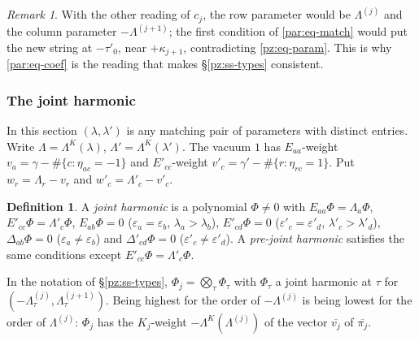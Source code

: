 \documentclass[10pt]{amsart}
\theoremstyle{definition}
\newtheorem{definition}[theorem]{Definition}
\theoremstyle{remark}
\newtheorem{remark}[theorem]{Remark}
\begin{document}
\begin{remark}\label{par:rem-match}
With the other reading of $c_j$, the row parameter would be $\Lambda^{(j)}$ and the column parameter
$-\Lambda^{(j+1)}$; the first condition of \eqref{par:eq-match} would put the new string at $-\tau'_0$,
near $+\kappa_{j+1}$, contradicting \eqref{pz:eq-param}. This is why \eqref{par:eq-coef} is the
reading that makes \S\ref{pz:ss-types} consistent.
\end{remark}

\subsubsection{The joint harmonic}\label{par:ss-harm}
In this section $(\lambda,\lambda')$ is any matching pair of parameters with distinct entries.
Write $\Lambda=\Lambda^K(\lambda)$, $\Lambda'=\Lambda^K(\lambda')$. The vacuum $1$ has $E_{aa}$-weight
$v_a=\gamma-\#\{c:\eta_{ac}=-1\}$ and $E'_{cc}$-weight $v'_c=\gamma'-\#\{r:\eta_{rc}=1\}$. Put
$w_r=\Lambda_r-v_r$ and $w'_c=\Lambda'_c-v'_c$.

\begin{definition}\label{par:def-harm}
A \emph{joint harmonic} is a polynomial $\Phi\ne0$ with $E_{aa}\Phi=\Lambda_a\Phi$,
$E'_{cc}\Phi=\Lambda'_c\Phi$, $E_{ab}\Phi=0$ ($\varepsilon_a=\varepsilon_b$, $\lambda_a>\lambda_b$),
$E'_{cd}\Phi=0$ ($\varepsilon'_c=\varepsilon'_d$, $\lambda'_c>\lambda'_d$), $\Delta_{ab}\Phi=0$
($\varepsilon_a\ne\varepsilon_b$) and $\Delta'_{cd}\Phi=0$ ($\varepsilon'_c\ne\varepsilon'_d$). A
\emph{pre-joint harmonic} satisfies the same conditions except $E'_{cc}\Phi=\Lambda'_c\Phi$.
\end{definition}
In the notation of \S\ref{pz:ss-types}, $\Phi_j=\bigotimes_\tau\Phi_\tau$ with $\Phi_\tau$ a joint
harmonic at $\tau$ for $(-\Lambda^{(j)}_\tau,\Lambda^{(j+1)}_\tau)$. Being highest for the order of
$-\Lambda^{(j)}$ is being lowest for the order of $\Lambda^{(j)}$: $\Phi_j$ has the $K_j$-weight
$-\Lambda^K(\Lambda^{(j)})$ of the vector $\overline{v_j}$ of $\overline{\pi_j}$.
\end{document}
